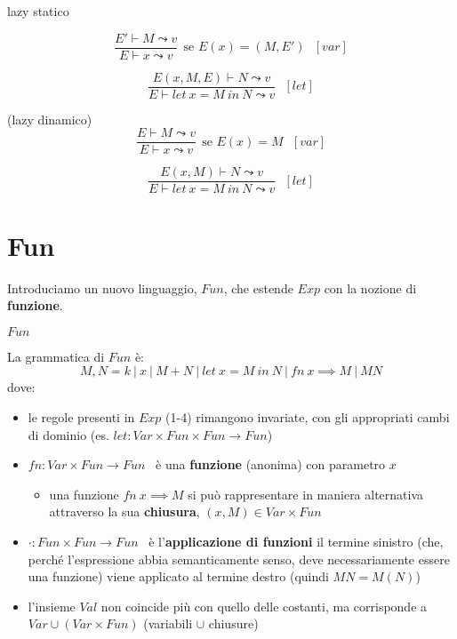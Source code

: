 \documentclass[a4paper,11pt]{report}
\begin{document}
\begin{gbox}[colframe=DeepTeal, colback=DeepTealLight, colbacktitle=DeepTeal]{lazy statico}
    
    \[ \frac{E'\vdash M \leadsto v}{E\vdash x \leadsto v} \ \ \text{se } E(x)=(M, E') \ \ \ [var] \]

    \[ \frac{E(x, M, E)\vdash N \leadsto v}{E \vdash let \ x = M \ in \ N \leadsto v} \ \ \ [let]\]


\end{gbox}


\begin{gbox}[colframe=BlueGray, colback=BlueGrayLight, colbacktitle=BlueGray]{(lazy dinamico)}
    \[ \frac{E\vdash M \leadsto v}{E\vdash x \leadsto v} \ \ \text{se } E(x)=M \ \ \ [var]\]

    \[ \frac{E(x, M)\vdash N \leadsto v}{E \vdash let \ x = M \ in \ N \leadsto v} \ \ \ [let] \]
\end{gbox}



\pagebreak

\section{Fun}
Introduciamo un nuovo linguaggio, \( Fun \), che estende \( Exp \) con la nozione di \textbf{funzione}.

\begin{defbox}{\( Fun \)}{}

La grammatica di \( Fun \) è:
    \[
        M, N = k \ | \ x \ | \ M + N \ | \ let \ x = M \ in \ N \ | \ fn \ x \implies M \ | \ MN
    \]
    dove:
    \begin{itemize}
        \item le regole presenti in \( Exp \) (1-4) rimangono invariate, con gli appropriati cambi di dominio (es. \( let : Var \times Fun \times Fun \to Fun \))
        \item \( fn : Var \times Fun \to Fun \) \ è una \textbf{funzione} (anonima) con parametro \( x \)     
        \begin{itemize}
            \item una funzione \( fn \ x \implies M \) si può rappresentare in maniera alternativa attraverso la sua \textbf{chiusura}, \( (x, M)\in Var \times Fun \)
        \end{itemize}
    \item \( \cdot : Fun \times Fun \to Fun \) \ è l'\textbf{applicazione di funzioni} 
        \subitem il termine sinistro (che, perché l'espressione abbia semanticamente senso, deve necessariamente essere una funzione) viene applicato al termine destro (quindi \( MN=M(N) \))
    \item l'insieme \( Val \) non coincide più con quello delle costanti, ma corrisponde a \( Var \cup (Var \times Fun) \) (variabili \( \cup \) chiusure)
    \end{itemize}

\end{defbox}
\end{document}
